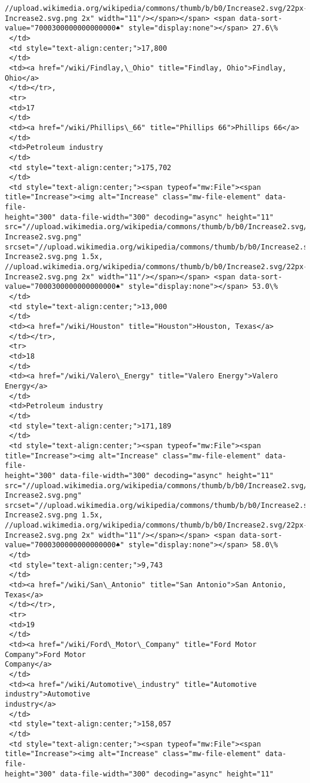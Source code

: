 \documentclass[11pt]{article}
\begin{document}
\begin{tcolorbox}[breakable, size=fbox, boxrule=.5pt, pad at break*=1mm, opacityfill=0]
\begin{Verbatim}[commandchars=\\\{\}]
//upload.wikimedia.org/wikipedia/commons/thumb/b/b0/Increase2.svg/22px-
Increase2.svg.png 2x" width="11"/></span></span> <span data-sort-
value="7000300000000000000♠" style="display:none"></span> 27.6\%
 </td>
 <td style="text-align:center;">17,800
 </td>
 <td><a href="/wiki/Findlay,\_Ohio" title="Findlay, Ohio">Findlay, Ohio</a>
 </td></tr>,
 <tr>
 <td>17
 </td>
 <td><a href="/wiki/Phillips\_66" title="Phillips 66">Phillips 66</a>
 </td>
 <td>Petroleum industry
 </td>
 <td style="text-align:center;">175,702
 </td>
 <td style="text-align:center;"><span typeof="mw:File"><span
title="Increase"><img alt="Increase" class="mw-file-element" data-file-
height="300" data-file-width="300" decoding="async" height="11"
src="//upload.wikimedia.org/wikipedia/commons/thumb/b/b0/Increase2.svg/11px-
Increase2.svg.png"
srcset="//upload.wikimedia.org/wikipedia/commons/thumb/b/b0/Increase2.svg/17px-
Increase2.svg.png 1.5x,
//upload.wikimedia.org/wikipedia/commons/thumb/b/b0/Increase2.svg/22px-
Increase2.svg.png 2x" width="11"/></span></span> <span data-sort-
value="7000300000000000000♠" style="display:none"></span> 53.0\%
 </td>
 <td style="text-align:center;">13,000
 </td>
 <td><a href="/wiki/Houston" title="Houston">Houston, Texas</a>
 </td></tr>,
 <tr>
 <td>18
 </td>
 <td><a href="/wiki/Valero\_Energy" title="Valero Energy">Valero Energy</a>
 </td>
 <td>Petroleum industry
 </td>
 <td style="text-align:center;">171,189
 </td>
 <td style="text-align:center;"><span typeof="mw:File"><span
title="Increase"><img alt="Increase" class="mw-file-element" data-file-
height="300" data-file-width="300" decoding="async" height="11"
src="//upload.wikimedia.org/wikipedia/commons/thumb/b/b0/Increase2.svg/11px-
Increase2.svg.png"
srcset="//upload.wikimedia.org/wikipedia/commons/thumb/b/b0/Increase2.svg/17px-
Increase2.svg.png 1.5x,
//upload.wikimedia.org/wikipedia/commons/thumb/b/b0/Increase2.svg/22px-
Increase2.svg.png 2x" width="11"/></span></span> <span data-sort-
value="7000300000000000000♠" style="display:none"></span> 58.0\%
 </td>
 <td style="text-align:center;">9,743
 </td>
 <td><a href="/wiki/San\_Antonio" title="San Antonio">San Antonio, Texas</a>
 </td></tr>,
 <tr>
 <td>19
 </td>
 <td><a href="/wiki/Ford\_Motor\_Company" title="Ford Motor Company">Ford Motor
Company</a>
 </td>
 <td><a href="/wiki/Automotive\_industry" title="Automotive industry">Automotive
industry</a>
 </td>
 <td style="text-align:center;">158,057
 </td>
 <td style="text-align:center;"><span typeof="mw:File"><span
title="Increase"><img alt="Increase" class="mw-file-element" data-file-
height="300" data-file-width="300" decoding="async" height="11"

\end{Verbatim}
\end{tcolorbox}
\end{document}
